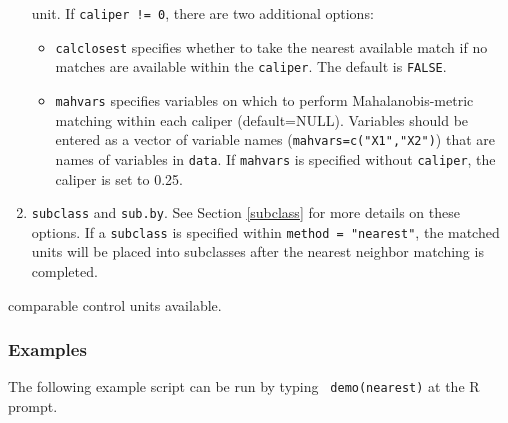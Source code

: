 \documentclass[oneside,letterpaper,titlepage]{article}
\begin{document}
\begin{enumerate}
  unit.  If \texttt{caliper != 0}, there are two additional options:
  \begin{itemize} 
  \item \texttt{calclosest} specifies whether to take the nearest
    available match if no matches are available within the
    \texttt{caliper}. The default is {\tt FALSE}.
  \item \texttt{mahvars} specifies variables on which to perform
    Mahalanobis-metric matching within each caliper (default=NULL).
    Variables should be entered as a vector of variable names
    (\texttt{mahvars=c("X1","X2")}) that are names of variables in
    \texttt{data}.  If \texttt{mahvars} is specified without
    \texttt{caliper}, the caliper is set to 0.25.
  \end{itemize}
\item \texttt{subclass} and \texttt{sub.by}.  See Section
  \ref{subclass} for more details on these options.  If a
  \texttt{subclass} is specified within \texttt{method = "nearest"},
  the matched units will be placed into subclasses after the nearest
  neighbor matching is completed.
\end{enumerate}

comparable control units available. 

\subsubsection{Examples}

The following example script can be run by typing {\tt
    demo(nearest)} at the R prompt.
\end{document}
